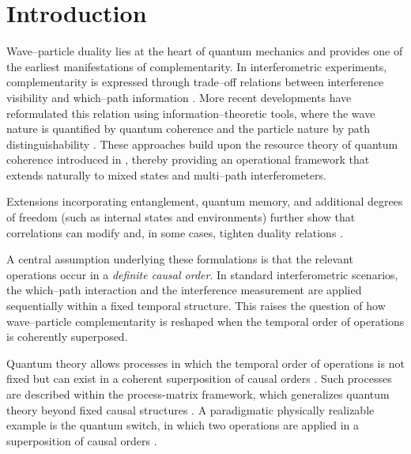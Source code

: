 \documentclass[aps,pra,reprint,superscriptaddress]{revtex4-2}
\begin{document}
\maketitle
    
\section{Introduction}
Wave--particle duality lies at the heart of quantum mechanics and
provides one of the earliest manifestations of complementarity.
In interferometric experiments, complementarity is expressed
through trade--off relations between interference visibility
and which--path information
\cite{WoottersZurek,GreenbergerYasin,Englert,Duerr2001,SiddiquiQureshi2015}.
More recent developments have reformulated this relation using
information--theoretic tools, where the wave nature is quantified
by quantum coherence and the particle nature by path distinguishability
\cite{Bera2015,Bagan2016,QureshiSiddiqui2017,Qureshi2019,SiddiquiQureshi2021}.
These approaches build upon the resource theory of quantum coherence
introduced in \cite{Baumgratz2014,Streltsov2017}, thereby providing
an operational framework that extends naturally to mixed states
and multi--path interferometers.

Extensions incorporating entanglement, quantum memory, and additional
degrees of freedom (such as internal states and environments) further
show that correlations can modify and, in some cases, tighten duality
relations \cite{JakobBergou2007,Bu2018,Roy2022,Sun2025,Banaszek2013,Sharma2020}.

A central assumption underlying these formulations is that the relevant
operations occur in a \emph{definite causal order}. In standard
interferometric scenarios, the which--path interaction and the
interference measurement are applied sequentially within a fixed
temporal structure. This raises the question of how wave--particle
complementarity is reshaped when the temporal order of operations is
coherently superposed.

Quantum theory allows processes in which the temporal order of
operations is not fixed but can exist in a coherent superposition of
causal orders \cite{Oreshkov2012,Chiribella2013,Brukner2014}.
Such processes are described within the process-matrix framework,
which generalizes quantum theory beyond fixed causal structures
\cite{Oreshkov2012}. A paradigmatic physically realizable example is the
quantum switch, in which two operations are applied in a superposition
of causal orders \cite{Chiribella2013}.
\end{document}
